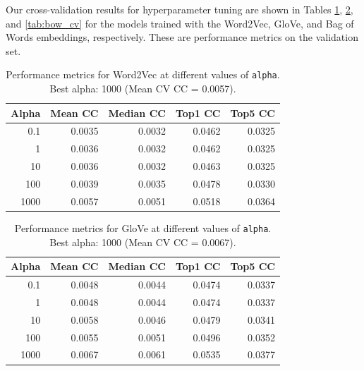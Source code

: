 \documentclass[10pt,letterpaper]{article}
\begin{document}
Our cross-validation results for hyperparameter tuning are shown in Tables \ref{tab:word2vec_cv}, \ref{tab:glove_cv}, and \ref{tab:bow_cv} for the models trained with the Word2Vec, GloVe, and Bag of Words embeddings, respectively. These are performance metrics on the validation set.


\begin{table}[ht]
\centering
\caption{Performance metrics for Word2Vec at different values of \texttt{alpha}. Best alpha: 1000 (Mean CV CC = 0.0057).}
\label{tab:word2vec_cv}
\begin{tabular}{rrrrr}
\toprule
\textbf{Alpha} & \textbf{Mean CC} & \textbf{Median CC} & \textbf{Top1 CC} & \textbf{Top5 CC} \\
\midrule
0.1    & 0.0035 & 0.0032 & 0.0462 & 0.0325 \\
1      & 0.0036 & 0.0032 & 0.0462 & 0.0325 \\
10     & 0.0036 & 0.0032 & 0.0463 & 0.0325 \\
100    & 0.0039 & 0.0035 & 0.0478 & 0.0330 \\
1000   & 0.0057 & 0.0051 & 0.0518 & 0.0364 \\
\bottomrule
\end{tabular}
\end{table}

\begin{table}[ht]
\centering
\caption{Performance metrics for GloVe at different values of \texttt{alpha}. Best alpha: 1000 (Mean CV CC = 0.0067).}
\label{tab:glove_cv}
\begin{tabular}{rrrrr}
\toprule
\textbf{Alpha} & \textbf{Mean CC} & \textbf{Median CC} & \textbf{Top1 CC} & \textbf{Top5 CC} \\
\midrule
0.1    & 0.0048 & 0.0044 & 0.0474 & 0.0337 \\
1      & 0.0048 & 0.0044 & 0.0474 & 0.0337 \\
10     & 0.0058 & 0.0046 & 0.0479 & 0.0341 \\
100    & 0.0055 & 0.0051 & 0.0496 & 0.0352 \\
1000   & 0.0067 & 0.0061 & 0.0535 & 0.0377 \\
\bottomrule
\end{tabular}
\end{table}
\end{document}
